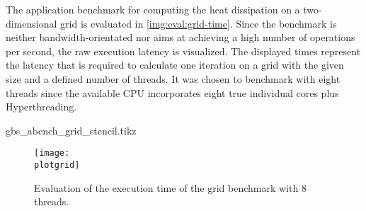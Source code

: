 The application benchmark for computing the heat dissipation on a two\--di\-men\-si\-o\-nal grid is evaluated in \autoref{img:eval:grid-time}. Since the benchmark is neither bandwidth-orientated nor aims at achieving a high number of operations per second, the raw execution latency is visualized. The displayed times represent the latency that is required to calculate one iteration on a grid with the given size and a defined number of threads. It was chosen to benchmark with eight threads since the available \ac{CPU} incorporates eight true individual cores plus Hyperthreading. 


\newcommand{\plotgrid}{gbs_abench_grid_stencil.tikz}
\begin{filecontents}{\plotgrid}

\newcommand{\csv}{gbs_abench_grid_stencil.csv}
\newcommand{\csvgi}{result-gi/\csv}
\newcommand{\csvte}{result-te/\csv}
\newcommand{\csvipoib}{result-ipoib/\csv}
\newcommand{\csvib}{result-ib/\csv}

\end{filecontents}

\begin{figure}[htb]
\centering
\texttt{[image: \\plotgrid]}
\caption{Evaluation of the execution time of the grid benchmark with 8 threads.}
\label{img:eval:grid-time}
\end{figure}

